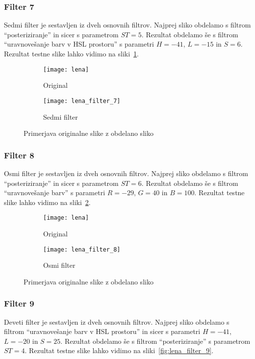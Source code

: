 \subsubsection*{Filter 7}
Sedmi filter je sestavljen iz dveh osnovnih filtrov. Najprej sliko obdelamo s
filtrom ``posteriziranje'' in sicer s parametrom $ST = 5$. Rezultat obdelamo
še s filtrom ``uravnovešanje barv v HSL prostoru'' s parametri $H = -41$,
$L = -15$ in $S = 6$. Rezultat testne slike lahko vidimo na
sliki~\ref{fig:lena_filter_7}.

\begin{figure}[!ht]
    \centering
    \begin{subfigure}[b]{0.4\textwidth}
        \texttt{[image: lena]}
        \caption{Original}
    \end{subfigure}
    \begin{subfigure}[b]{0.4\textwidth}
        \texttt{[image: lena\_filter\_7]}
        \caption{Sedmi filter}
    \end{subfigure}
    \caption{Primerjava originalne slike z obdelano sliko}
    \label{fig:lena_filter_7}
\end{figure}


\subsubsection*{Filter 8}
Osmi filter je sestavljen iz dveh osnovnih filtrov. Najprej sliko obdelamo s
filtrom ``posteriziranje'' in sicer s parametrom $ST = 6$. Rezultat obdelamo
še s filtrom ``uravnovešanje barv'' s parametri $R = -29$, $G = 40$ in $B = 100$.
Rezultat testne slike lahko vidimo na sliki~\ref{fig:lena_filter_8}.

\begin{figure}[!ht]
    \centering
    \begin{subfigure}[b]{0.4\textwidth}
        \texttt{[image: lena]}
        \caption{Original}
    \end{subfigure}
    \begin{subfigure}[b]{0.4\textwidth}
        \texttt{[image: lena\_filter\_8]}
        \caption{Osmi filter}
    \end{subfigure}
    \caption{Primerjava originalne slike z obdelano sliko}
    \label{fig:lena_filter_8}
\end{figure}


\subsubsection*{Filter 9}
Deveti filter je sestavljen iz dveh osnovnih filtrov. Najprej sliko obdelamo s
filtrom ``uravnovešanje barv v HSL prostoru'' in sicer s parametri $H = -41$,
$L = -20$ in $S = 25$. Rezultat obdelamo še s filtrom ``posteriziranje'' s
parametrom $ST = 4$. Rezultat testne slike lahko vidimo na
sliki~\ref{fig:lena_filter_9}.

